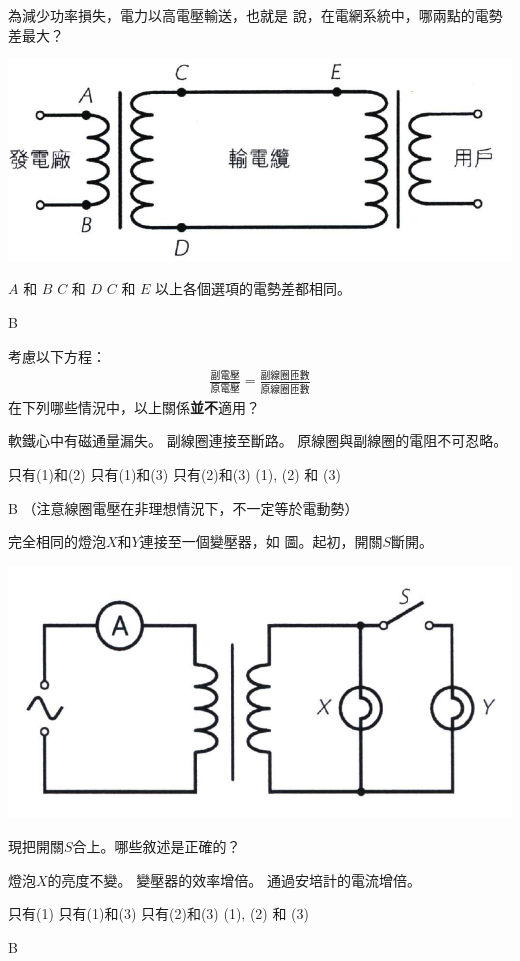 {
    為減少功率損失，電力以高電壓輸送，也就是 說，在電網系統中，哪兩點的電勢差最大？
    \par{\par\centering\includegraphics[width=.35\textwidth]{./img/ch_ACtransformer_mc_2024-06-17-20-11-50.png}\par}
    \begin{tasks}
        \task $A$ 和 $B$
        \task $C$ 和 $D$
        \task $C$ 和 $E$
        \task 以上各個選項的電勢差都相同。
    \end{tasks}
}{B}

{
    考慮以下方程：
    \begin{align*}
        \frac{\textrm{副電壓}}{\textrm{原電壓}} = \frac{\textrm{副線圈匝數}}{\textrm{原線圈匝數}}
    \end{align*}
    在下列哪些情況中，以上關係\textbf{並不}適用？
    \begin{statements}
        \task 軟鐵心中有磁通量漏失。
        \task 副線圈連接至斷路。
        \task 原線圈與副線圈的電阻不可忍略。
    \end{statements}
    \begin{tasks}
        \task 只有(1)和(2)
        \task 只有(1)和(3)
        \task 只有(2)和(3)
        \task (1), (2) 和 (3)
    \end{tasks}
}{
    B
    （注意線圈電壓在非理想情況下，不一定等於電動勢）
}

{
    完全相同的燈泡$X$和$Y$連接至一個變壓器，如 圖。起初，開關$S$斷開。
    \par{\par\centering\includegraphics[width=.5\textwidth]{./img/ch_ACtransformer_mc_2024-06-17-20-21-05.png}\par}
    現把開關$S$合上。哪些敘述是正確的？
    \begin{statements}
        \task 燈泡$X$的亮度不變。
        \task 變壓器的效率增倍。
        \task 通過安培計的電流增倍。
    \end{statements}
    \begin{tasks}
        \task 只有(1)
        \task 只有(1)和(3)
        \task 只有(2)和(3)
        \task (1), (2) 和 (3)
    \end{tasks}
}{B}